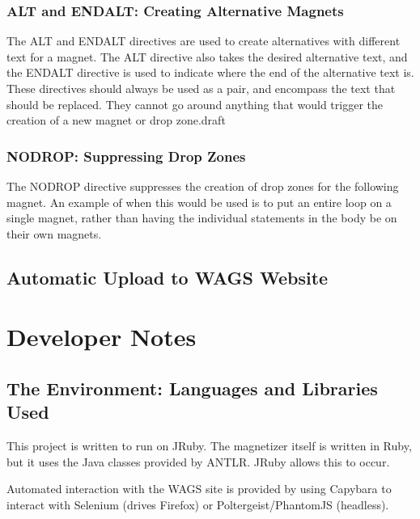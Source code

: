 \documentclass[letter,10pt]{article}
\begin{document}
\subsubsection{ALT and ENDALT: Creating Alternative Magnets}

The ALT and ENDALT directives are used to create alternatives with 
different text for a magnet. The ALT directive also takes the desired 
alternative text, and the ENDALT directive is used to indicate where 
the end of the alternative text is. These directives should always be 
used as a pair, and encompass the text that should be replaced. They 
cannot go around anything that would trigger the creation of a new 
magnet or drop zone.draft


\subsubsection{NODROP: Suppressing Drop Zones}

The NODROP directive suppresses the creation of drop zones for the 
following magnet. An example of when this would be used is to put an 
entire loop on a single magnet, rather than having the individual 
statements in the body be on their own magnets.



\subsection{Automatic Upload to WAGS Website}

\section{Developer Notes}

\subsection{The Environment: Languages and Libraries Used}


This project is written to run on JRuby. The magnetizer itself is 
written in Ruby, but it uses the Java classes provided by ANTLR. JRuby 
allows this to occur.

Automated interaction with the WAGS site is provided by using Capybara 
to interact with Selenium (drives Firefox) or Poltergeist/PhantomJS 
(headless).
\end{document}

